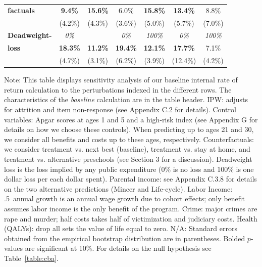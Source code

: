 \documentclass[static]{JJH-Beamer}
\begin{document}
\begin{frame}
\begin{table}[H]
\begin{center}
{\begin{tabular}{>{\bfseries}lcc|cc|cc}
factuals	&	\textbf{9.4\%}	&	\textbf{15.6\%}	&	6.0\%	&	\textbf{15.8\%}	&	\textbf{13.4\%}	&	8.8\%	\\
	&	(4.2\%)	&	(4.3\%)	&	(3.6\%)	&	(5.0\%)	&	(5.7\%)	&	(7.0\%)	\\ \midrule
Deadweight-	&	\textit{0\%}	&	\textit{100\%\textit}	&	\textit{0\%}	&	\textit{100\%}	&	\textit{0\%}	&	\textit{100\%}	\\
loss	&	\textbf{18.3\%}	&	\textbf{11.2\%}	&	\textbf{19.4\%}	&	\textbf{12.1\%}	&	\textbf{17.7\%}	&	7.1\%	\\
	&	(4.7\%)	&	(3.1\%)	&	(6.2\%)	&	(3.9\%)	&	(12.4\%)	&	(4.2\%)	\\ 
\bottomrule
\end{tabular}
}
\end{center}
\end{table}

\end{frame}

{\flushleft \small Note: This table displays sensitivity analysis of our baseline internal rate of return calculation to the perturbations indexed in the different rows. The characteristics of the \textit{baseline} calculation are in the table header. IPW: adjusts for attrition and item non-response (see Appendix C.2 for details). Control variables: Apgar scores at ages 1 and 5 and a high-risk index (see Appendix G for details on how we choose these controls). When predicting up to ages 21 and 30, we consider all benefits and costs up to these ages, respectively. Counterfactuals: we consider treatment vs. next best (baseline), treatment vs. stay at home, and treatment vs. alternative preschools (see Section 3 for a discussion). Deadweight loss is the loss implied by any public expenditure (0\% is no loss and 100\% is one dollar loss per each dollar spent). Parental income: see Appendix C.3.8 for details on the two alternative predictions (Mincer and Life-cycle). Labor Income: .5\ annual growth is an annual wage growth due to cohort effects; only benefit assumes labor income is the only benefit of the program. Crime: major crimes are rape and murder; half costs takes half of victimization and judiciary costs. Health (QALYs): drop all sets the value of life equal to zero. N/A: Standard errors obtained from the empirical bootstrap distribution are in parentheses. Bolded $p$-values are significant at 10\%. For details on the null hypothesis see Table~\ref{table:cba}.\\}
\end{document}
